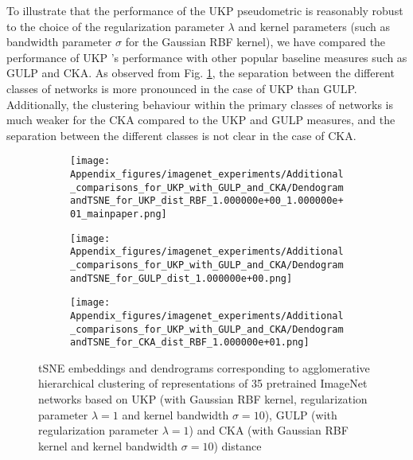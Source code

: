 \documentclass{article} %
\newcommand{\metricstname}{UKP }
\theoremstyle{plain}
\begin{document}
To illustrate that the performance of the \metricstname pseudometric is reasonably robust to the choice of the regularization parameter $\lambda$ and kernel parameters (such as bandwidth parameter $\sigma$ for the Gaussian RBF kernel), we have compared the performance of \metricstname's performance with other popular baseline measures such as GULP and CKA. As observed from Fig. \ref{ImageNet dendrograms additional}, the separation between the different classes of networks is more pronounced in the case of \metricstname than GULP. Additionally, the clustering behaviour within the primary classes of networks is much weaker for the CKA compared to the \metricstname and GULP measures, and the separation between the different classes is not clear in the case of CKA.

\begin{figure}[!h]
    \centering

    \hspace*{\fill}
    \begin{subfigure}[b]{0.45\textwidth}
        \texttt{[image: Appendix\_figures/imagenet\_experiments/Additional\_comparisons\_for\_UKP\_with\_GULP\_and\_CKA/DendogramandTSNE\_for\_UKP\_dist\_RBF\_1.000000e+00\_1.000000e+01\_mainpaper.png]}
    \end{subfigure}
    \hspace*{\fill}

    \vspace{0.5cm}  %
    
    \begin{subfigure}[b]{0.45\textwidth}
        \texttt{[image: Appendix\_figures/imagenet\_experiments/Additional\_comparisons\_for\_UKP\_with\_GULP\_and\_CKA/DendogramandTSNE\_for\_GULP\_dist\_1.000000e+00.png]}
    \end{subfigure}
    \hfill
    \begin{subfigure}[b]{0.45\textwidth}
        \texttt{[image: Appendix\_figures/imagenet\_experiments/Additional\_comparisons\_for\_UKP\_with\_GULP\_and\_CKA/DendogramandTSNE\_for\_CKA\_dist\_RBF\_1.000000e+01.png]}
    \end{subfigure}

     \caption{tSNE embeddings and dendrograms corresponding to agglomerative hierarchical clustering of representations of 35 pretrained ImageNet networks based on \metricstname (with Gaussian RBF kernel, regularization parameter $\lambda=1$ and kernel bandwidth $\sigma=10$), GULP (with regularization parameter $\lambda=1$) and CKA (with Gaussian RBF kernel and kernel bandwidth $\sigma=10$) distance}
    \label{ImageNet dendrograms additional}
\end{figure}
\end{document}

